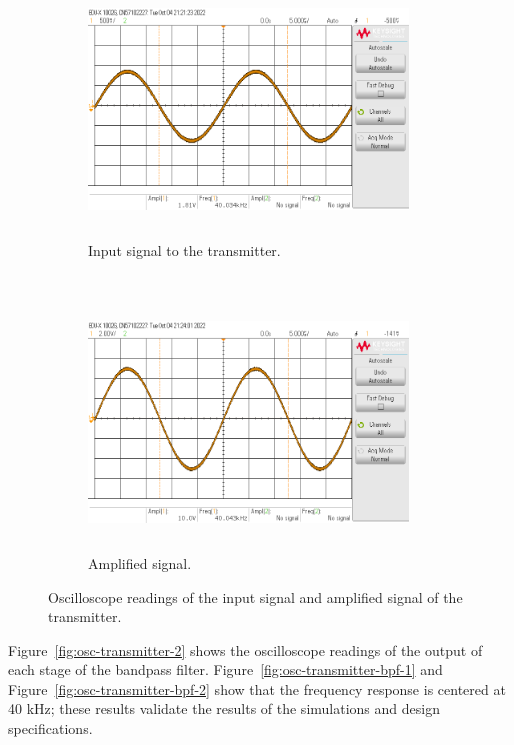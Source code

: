 \documentclass[class=report,11pt,crop=false]{standalone}
\begin{document}
\begin{figure}[htbp]
    \centering
    \captionsetup{type=figure}
    \begin{subfigure}[t]{0.5\textwidth}
        \centering
        \def\svgwidth{1\linewidth}
        {\scriptsize
            \includegraphics[width=8.5cm,height=6cm]{../Images/scope_1.png}}
        \caption{Input signal to the transmitter.}
        \label{fig:osc-transmitter-input}
    \end{subfigure}%
    ~ 
    \begin{subfigure}[t]{0.5\textwidth}
        \def\svgwidth{1\linewidth}
        {\scriptsize
            \includegraphics[width=8.5cm,height=6cm]{../Images/scope_2.png}}
        \caption{Amplified signal.}
        \label{fig:osc-transmitter-amplifier}
    \end{subfigure}
    \caption{Oscilloscope readings of the input signal and amplified signal of the transmitter.}
    \label{fig:osc-transmitter-1}
\end{figure}

Figure~\ref{fig:osc-transmitter-2} shows the oscilloscope readings of the output of each stage of the bandpass filter. Figure~\ref{fig:osc-transmitter-bpf-1} and Figure~\ref{fig:osc-transmitter-bpf-2} show that the frequency response is centered at 40 kHz; these results validate the results of the simulations and design specifications.
\end{document}
